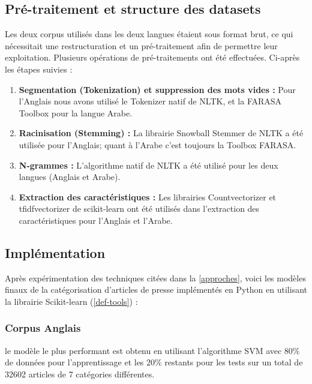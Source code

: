 \subsection{Pré-traitement et structure des datasets}
Les deux corpus utilisés dans les deux langues étaient sous format brut, ce qui nécessitait une restructuration et un pré-traitement afin de permettre leur exploitation. Plusieurs opérations de pré-traitements ont été effectuées. Ci-après les étapes suivies :

\begin{enumerate}
    \item{\textbf{Segmentation (Tokenization) et suppression des mots vides :} } Pour l'Anglais nous avons utilisé le Tokenizer natif de NLTK, et la FARASA Toolbox pour la langue Arabe.\\  
    
    \item{\textbf{Racinisation (Stemming) :} } 
    La librairie Snowball Stemmer de NLTK a été utilisée pour l'Anglais; quant à l'Arabe c'est toujours la Toolbox FARASA.\\
    
    \item{\textbf{N-grammes :} }
    L'algorithme natif de NLTK a été utilisé pour les deux langues (Anglais et Arabe).\\ 
    
    \item{\textbf{Extraction des caractéristiques :} }
    Les librairies Countvectorizer et tfidfvectorizer de scikit-learn ont été utilisés dans l'extraction des caractéristiques pour l'Anglais et l'Arabe.\\
\end{enumerate}


\subsection{Implémentation}
Après expérimentation des techniques citées dans la \autoref{approches}, voici les modèles finaux de la catégorisation d'articles de presse implémentés en Python en utilisant la librairie Scikit-learn (\autoref{def-tools}) :

    \subsubsection{Corpus Anglais}
    le modèle le plus performant est obtenu en utilisant l'algorithme SVM avec 80\% de données pour l'apprentissage et les 20\% restants pour les tests sur un total de 32602 articles de 7 catégories différentes.
    
